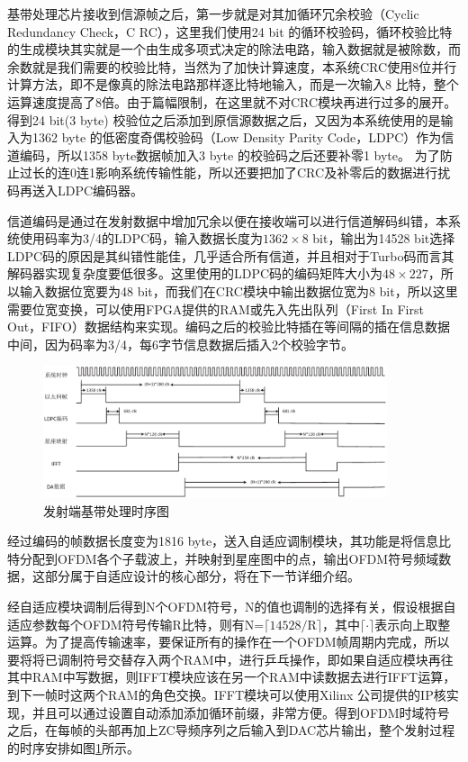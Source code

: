 基带处理芯片接收到信源帧之后，第一步就是对其加循环冗余校验（Cyclic Redundancy Check，C RC），这里我们使用24 bit 的循环校验码，循环校验比特的生成模块其实就是一个由生成多项式决定的除法电路，输入数据就是被除数，而余数就是我们需要的校验比特，当然为了加快计算速度，本系统CRC使用8位并行计算方法，即不是像真的除法电路那样逐比特地输入，而是一次输入8 比特，整个运算速度提高了8倍。由于篇幅限制，在这里就不对CRC模块再进行过多的展开。得到24 bit(3 byte) 校验位之后添加到原信源数据之后，又因为本系统使用的是输入为1362 byte 的低密度奇偶校验码（Low Density Parity Code，LDPC）作为信道编码，所以1358 byte数据帧加入3 byte 的校验码之后还要补零1 byte。 为了防止过长的连0连1影响系统传输性能，所以还要把加了CRC及补零后的数据进行扰码再送入LDPC编码器。

信道编码是通过在发射数据中增加冗余以便在接收端可以进行信道解码纠错，本系统使用码率为3/4的LDPC码，输入数据长度为$1362\times 8$ bit，输出为14528 bit选择LDPC码的原因是其纠错性能佳，几乎适合所有信道，并且相对于Turbo码而言其解码器实现复杂度要低很多。这里使用的LDPC码的编码矩阵大小为$48\times 227$，所以输入数据位宽要为48 bit，而我们在CRC模块中输出数据位宽为8 bit，所以这里需要位宽变换，可以使用FPGA提供的RAM或先入先出队列（First In First Out，FIFO）数据结构来实现。编码之后的校验比特插在等间隔的插在信息数据中间，因为码率为3/4，每6字节信息数据后插入2个校验字节。

\begin{figure}[htbp]
\centering
\includegraphics[width=0.9\textwidth]{figures/chapter-5/TimeSchemeTrans.eps}
\caption{发射端基带处理时序图}
\label{fig:TimeSchemeTrans}
\end{figure}
经过编码的帧数据长度变为1816 byte，送入自适应调制模块，其功能是将信息比特分配到OFDM各个子载波上，并映射到星座图中的点，输出OFDM符号频域数据，这部分属于自适应设计的核心部分，将在下一节详细介绍。

经自适应模块调制后得到N个OFDM符号，N的值也调制的选择有关，假设根据自适应参数每个OFDM符号传输R比特，则有N=$\lceil 14528/\text{R} \rceil$，其中$\lceil \cdot \rceil$表示向上取整运算。为了提高传输速率，要保证所有的操作在一个OFDM帧周期内完成，所以要将将已调制符号交替存入两个RAM中，进行乒乓操作，即如果自适应模块再往其中RAM中写数据，则IFFT模块应该在另一个RAM中读数据去进行IFFT运算，到下一帧时这两个RAM的角色交换。IFFT模块可以使用Xilinx 公司提供的IP核实现，并且可以通过设置自动添加添加循环前缀，非常方便。得到OFDM时域符号之后，在每帧的头部再加上ZC导频序列之后输入到DAC芯片输出，整个发射过程的时序安排如图\ref{fig:TimeSchemeTrans}所示。

